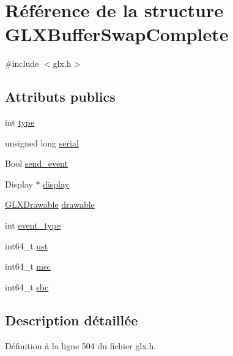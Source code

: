 \hypertarget{struct_g_l_x_buffer_swap_complete}{\section{Référence de la structure G\-L\-X\-Buffer\-Swap\-Complete}
\label{struct_g_l_x_buffer_swap_complete}
}


{\ttfamily \#include $<$glx.\-h$>$}

\subsection*{Attributs publics}
\begin{DoxyCompactItemize}
\item 
int \hyperlink{struct_g_l_x_buffer_swap_complete_a24826cc08d5619285041846b29ce698c}{type}
\item 
unsigned long \hyperlink{struct_g_l_x_buffer_swap_complete_ac52e1c5b9b030dd77e9d32f2eb5450da}{serial}
\item 
Bool \hyperlink{struct_g_l_x_buffer_swap_complete_a991953f319d092b7399c02d256ef00e6}{send\-\_\-event}
\item 
Display $\ast$ \hyperlink{struct_g_l_x_buffer_swap_complete_ad5ab9343db33df2e2abe97999d00e678}{display}
\item 
\hyperlink{glx_8h_a826f51745d9d6c81bdbac47ae2b80cf7}{G\-L\-X\-Drawable} \hyperlink{struct_g_l_x_buffer_swap_complete_a926866fb73d150fd7bfe85154855e97b}{drawable}
\item 
int \hyperlink{struct_g_l_x_buffer_swap_complete_a39b8f393f8eaa54db030751edac25d7d}{event\-\_\-type}
\item 
int64\-\_\-t \hyperlink{struct_g_l_x_buffer_swap_complete_ab0dfbf0a8ea5e9f274bd4564fd0b64b2}{ust}
\item 
int64\-\_\-t \hyperlink{struct_g_l_x_buffer_swap_complete_ad856b4068246e7a96ca26a938929ca15}{msc}
\item 
int64\-\_\-t \hyperlink{struct_g_l_x_buffer_swap_complete_a0830bc671be1a7ef8bceff791f3463a7}{sbc}
\end{DoxyCompactItemize}


\subsection{Description détaillée}


Définition à la ligne 504 du fichier glx.\-h.



